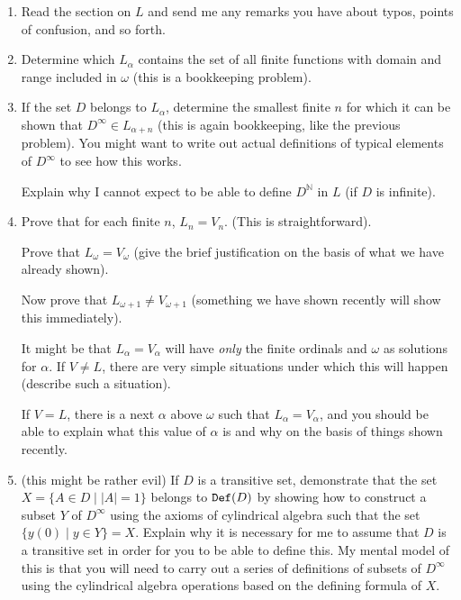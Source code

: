 \documentclass[12pt]{book}
\begin{document}
\begin{enumerate}

\item  Read the section on $L$ and send me any remarks you have about typos, points of confusion, and so forth.

\item  Determine which $L_{\alpha}$ contains the set of all finite functions with domain and range included in $\omega$ (this is a bookkeeping problem).

\item  If the set $D$ belongs to $L_{\alpha}$, determine the smallest finite $n$ for which it can be shown that $D^{\infty} \in L_{\alpha+n}$ (this is again bookkeeping, like the previous problem).  You might want to write out actual definitions of typical elements of $D^{\infty}$ to see how this works.

Explain why I cannot expect to be able to define $D^{\mathbb N}$ in $L$ (if $D$ is infinite).

\item  Prove that for each finite $n$, $L_n = V_n$.  (This is straightforward).

Prove that $L_{\omega} = V_{\omega}$ (give the brief justification on the basis of what we have already shown).

Now prove that $L_{\omega+1} \neq V_{\omega+1}$ (something we have shown recently will show this immediately).

It might be that $L_{\alpha} = V_{\alpha}$ will have {\em only\/} the finite ordinals and $\omega$ as solutions for $\alpha$.  If $V \neq L$,
there are very simple situations under which this will happen (describe such a situation).

If $V=L$, there is a next $\alpha$ above $\omega$ such that $L_{\alpha} = V_{\alpha}$, and you should be able to explain what this value
of $\alpha$ is and why on the basis of things shown recently.

\item (this might be rather evil)  If $D$ is a transitive set, demonstrate that the set $X=\{A \in D \mid |A|=1\}$ belongs to ${\tt Def}(D)$ by showing how to construct a subset $Y$ of $D^{\infty}$ using the axioms of cylindrical algebra such that the set $\{y(0) \mid y \in Y\}=X$.   Explain why it is necessary for me to assume that $D$ is a transitive set in order for you to be able to define this.  My mental model of this is that you will need to carry out a series of definitions of
subsets of $D^{\infty}$ using the cylindrical algebra operations based on the defining formula of $X$.



\end{enumerate}
\end{document}
